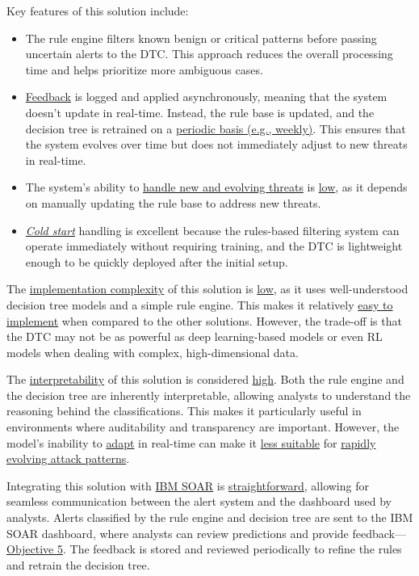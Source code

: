 Key features of this solution include:
\begin{itemize}
    \item The rule engine filters known benign or critical patterns before passing uncertain alerts to the DTC. This approach reduces the overall processing time and helps prioritize more ambiguous cases.
    \item \underline{Feedback} is logged and applied asynchronously, meaning that the system doesn't update in real-time. Instead, the rule base is updated, and the decision tree is retrained on a \underline{periodic basis (e.g., weekly)}. This ensures that the system evolves over time but does not immediately adjust to new threats in real-time.
    \item The system's ability to \underline{handle new and evolving threats} is \underline{low}, as it depends on manually updating the rule base to address new threats.
    \item \underline{\textit{Cold start}} handling is excellent because the rules-based filtering system can operate immediately without requiring training, and the DTC is lightweight enough to be quickly deployed after the initial setup.
\end{itemize}

The \underline{implementation complexity} of this solution is \underline{low}, as it uses well-understood decision tree models and a simple rule engine. 
This makes it relatively \underline{easy to implement} when compared to the other solutions. 
However, the trade-off is that the DTC may not be as powerful as deep learning-based models or even RL models when dealing with complex, high-dimensional data.

The \underline{interpretability} of this solution is considered \underline{high}. 
Both the rule engine and the decision tree are inherently interpretable, allowing analysts to understand the reasoning behind the classifications. 
This makes it particularly useful in environments where auditability and transparency are important. 
However, the model's inability to \underline{adapt} in real-time can make it \underline{less suitable} for \underline{rapidly evolving attack patterns}.

Integrating this solution with \underline{IBM SOAR} is \underline{straightforward}, allowing for seamless communication between the alert system and the dashboard used by analysts. 
Alerts classified by the rule engine and decision tree are sent to the IBM SOAR dashboard, where analysts can review predictions and provide feedback—\hyperref[objective5]{Objective 5}.
The feedback is stored and reviewed periodically to refine the rules and retrain the decision tree. 

